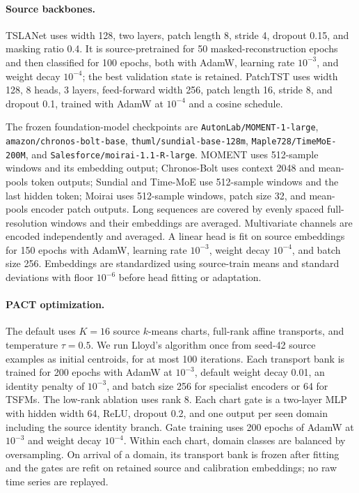 \documentclass[letterpaper]{article}
\begin{document}
\paragraph{Source backbones.}
TSLANet uses width 128, two layers, patch length 8, stride 4, dropout 0.15, and
masking ratio 0.4. It is source-pretrained for 50 masked-reconstruction epochs
and then classified for 100 epochs, both with AdamW, learning rate $10^{-3}$,
and weight decay $10^{-4}$; the best validation state is retained. PatchTST
uses width 128, 8 heads, 3 layers, feed-forward width 256, patch length 16,
stride 8, and dropout 0.1, trained with AdamW at $10^{-4}$ and a cosine schedule.

The frozen foundation-model checkpoints are
\texttt{AutonLab/MOMENT-1-large},
\texttt{amazon/chronos-bolt-base},
\texttt{thuml/sundial-base-128m},
\texttt{Maple728/TimeMoE-200M}, and
\texttt{Salesforce/moirai-1.1-R-large}. MOMENT uses 512-sample windows and its
embedding output; Chronos-Bolt uses context 2048 and mean-pools token outputs;
Sundial and Time-MoE use 512-sample windows and the last hidden token; Moirai
uses 512-sample windows, patch size 32, and mean-pools encoder patch outputs.
Long sequences are covered by evenly spaced full-resolution windows and their
embeddings are averaged. Multivariate channels are encoded independently and
averaged. A linear head is fit on source embeddings for 150 epochs with AdamW,
learning rate $10^{-3}$, weight decay $10^{-4}$, and batch size 256. Embeddings
are standardized using source-train means and standard deviations with floor
$10^{-6}$ before head fitting or adaptation.

\paragraph{PACT optimization.}
The default uses $K=16$ source $k$-means charts, full-rank affine transports,
and temperature $\tau=0.5$. We run Lloyd's algorithm once from seed-42 source
examples as initial centroids, for at most 100 iterations. Each transport bank
is trained for 200 epochs with AdamW at $10^{-3}$, default weight decay 0.01,
an identity penalty of $10^{-3}$, and batch size 256 for specialist encoders or
64 for TSFMs. The low-rank ablation uses rank 8. Each
chart gate is a two-layer MLP with hidden width 64, ReLU, dropout 0.2, and one
output per seen domain including the source identity branch. Gate training uses
200 epochs of AdamW at $10^{-3}$ and weight decay $10^{-4}$. Within each chart,
domain classes are balanced by oversampling. On arrival of a domain, its
transport bank is frozen after fitting and the gates are refit on retained
source and calibration embeddings; no raw time series are replayed.
\end{document}
